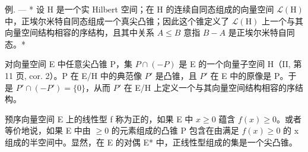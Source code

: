 例. --- * 设 H 是一个实 Hilbert 空间；在 H 的连续自同态组成的向量空间 \(\mathcal{L}(\mathrm{H})\) 中，正埃尔米特自同态组成一个真尖凸锥；因此这个锥定义了 \(\mathcal{L}(\mathrm{H})\) 上一个与其向量空间结构相容的序结构，且其中关系 \(A \leqslant B\) 意指 \(B - A\) 是正埃尔米特自同态。*

对向量空间 E 中任意尖凸锥 P，集 \(P \cap (-P)\) 是 E 的一个向量子空间 H（II, 第 11 页, cor. 2）。P 在 E/H 中的典范像 \(P'\) 是凸锥，且 \(P'\) 在 E 中的原像是 P。于是 \(P' \cap (-P') = \{0\}\)，从而 \(P'\) 在 E/H 上定义一个与其向量空间结构相容的序结构。

预序向量空间 E 上的线性型 f 称为正的，如果 E 中 \(x \geqslant 0\) 蕴含 \(f(x) \geqslant 0\)。或者等价地说，如果 E 中由 \(\geqslant 0\) 的元素组成的凸锥 P 包含在由满足 \(f(x) \geqslant 0\) 的 x 组成的半空间中。显然，在 E 的对偶 E* 中，正线性型组成的集是一个尖凸锥。


